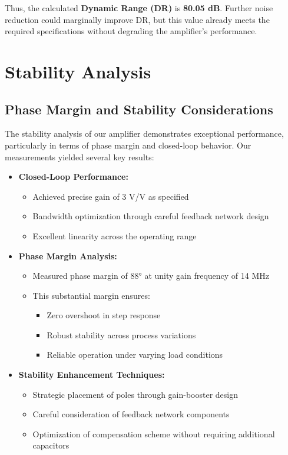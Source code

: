 \documentclass[a4paper,12pt]{article}
\begin{document}
Thus, the calculated \textbf{Dynamic Range (DR)} is \textbf{80.05 dB}. Further noise reduction could marginally improve DR, but this value already meets the required specifications without degrading the amplifier’s performance.
\section{Stability Analysis}

\subsection{Phase Margin and Stability Considerations}
The stability analysis of our amplifier demonstrates exceptional performance, particularly in terms of phase margin and closed-loop behavior. Our measurements yielded several key results:

\begin{itemize}
    \item \textbf{Closed-Loop Performance:}
    \begin{itemize}
        \item Achieved precise gain of 3 V/V as specified
        \item Bandwidth optimization through careful feedback network design
        \item Excellent linearity across the operating range
    \end{itemize}
    
    \item \textbf{Phase Margin Analysis:}
    \begin{itemize}
        \item Measured phase margin of 88° at unity gain frequency of 14 MHz
        \item This substantial margin ensures:
        \begin{itemize}
            \item Zero overshoot in step response
            \item Robust stability across process variations
            \item Reliable operation under varying load conditions
        \end{itemize}
    \end{itemize}
    
    \item \textbf{Stability Enhancement Techniques:}
    \begin{itemize}
        \item Strategic placement of poles through gain-booster design
        \item Careful consideration of feedback network components
        \item Optimization of compensation scheme without requiring additional capacitors
    \end{itemize}
\end{itemize}
\end{document}
